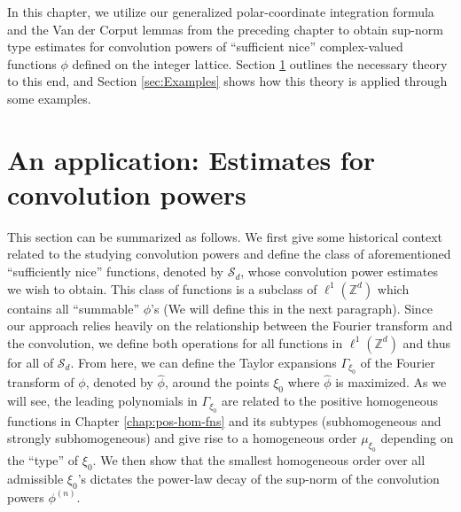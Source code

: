 \documentclass[11pt, letter]{book}
\begin{document}
In this chapter, we utilize our generalized polar-coordinate integration formula and the Van der Corput lemmas from the preceding chapter to obtain sup-norm type estimates for convolution powers of ``sufficient nice'' complex-valued functions $\phi$ defined on the integer lattice. Section \ref{sec:ConvolutionPowers} outlines the necessary theory to this end, and Section \ref{sec:Examples} shows how this theory is applied through some examples.



\section{An application: Estimates for convolution powers}\label{sec:ConvolutionPowers}

This section can be summarized as follows. We first give some historical context related to the studying convolution powers and define the class of aforementioned ``sufficiently nice'' functions, denoted by $\mathcal{S}_d$, whose convolution power estimates we wish to obtain. This class of functions is a subclass of $\ell^1(\mathbb{Z}^d)$ which contains all ``summable'' $\phi$'s (We will define this in the next paragraph). Since our approach relies heavily on the relationship between the Fourier transform and the convolution, we define both operations for all functions in $\ell^1(\mathbb{Z}^d)$ and thus for all of $\mathcal{S}_d$.  From here, we can define the Taylor expansions $\Gamma_{\xi_0}$ of the Fourier transform of $\phi$, denoted by $\widehat{\phi}$, around the points $\xi_0$ where $\widehat{\phi}$ is maximized. As we will see, the leading polynomials in $\Gamma_{\xi_0}$ are related to the positive homogeneous functions in Chapter \ref{chap:pos-hom-fns} and its subtypes (subhomogeneous and strongly subhomogeneous) and give rise to a homogeneous order $\mu_{\xi_0}$ depending on the ``type'' of $\xi_0$. We then show that the smallest homogeneous order over all admissible $\xi_0$'s dictates the power-law decay of the sup-norm of the convolution powers $\phi^{(n)}$.\\
\end{document}
